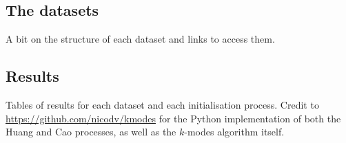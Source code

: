 \begin{definition}\label{def:homogeneity}
\end{definition}

\begin{definition}\label{def:completeness}
\end{definition}

\subsection{The datasets}\label{subsec:datasets}

A bit on the structure of each dataset and links to access them.


\subsection{Results}\label{subsec:results}

Tables of results for each dataset and each initialisation process. Credit to 
\url{https://github.com/nicodv/kmodes} for the Python implementation of both the
Huang and Cao processes, as well as the $k$-modes algorithm itself.

\begin{table}[H]
\resizebox{\textwidth}{!}{%
\centering
    
}
\end{table}
